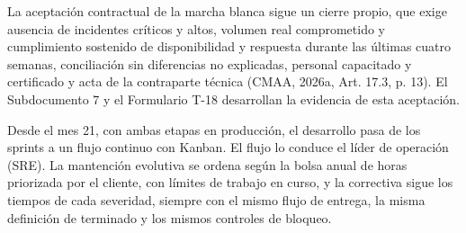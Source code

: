 \documentclass[subdoc]{../../comun/overfore}
\begin{document}
La aceptación contractual de la marcha blanca sigue un cierre propio, que exige ausencia de incidentes críticos y altos, volumen real comprometido y cumplimiento sostenido de disponibilidad y respuesta durante las últimas cuatro semanas, conciliación sin diferencias no explicadas, personal capacitado y certificado y acta de la contraparte técnica (CMAA, 2026a, Art. 17.3, p. 13). El Subdocumento 7 y el Formulario T-18 desarrollan la evidencia de esta aceptación.

Desde el mes 21, con ambas etapas en producción, el desarrollo pasa de los sprints a un flujo continuo con Kanban. El flujo lo conduce el líder de operación (SRE). La mantención evolutiva se ordena según la bolsa anual de horas priorizada por el cliente, con límites de trabajo en curso, y la correctiva sigue los tiempos de cada severidad, siempre con el mismo flujo de entrega, la misma definición de terminado y los mismos controles de bloqueo.
\end{document}
